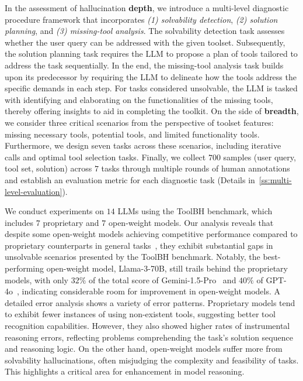 \documentclass[11pt]{article}
\newcommand{\benchname}{ToolBH\xspace}
\begin{document}
In the assessment of hallucination \textbf{depth}, we introduce a multi-level diagnostic procedure framework that incorporates \textit{(1) solvability detection}, \textit{(2) solution planning}, and \textit{(3) missing-tool analysis}.
The solvability detection task assesses whether the user query can be addressed with the given toolset. 
Subsequently, the solution planning task requires the LLM to propose a plan of tools tailored to address the task sequentially. 
In the end, the missing-tool analysis task builds upon its predecessor by requiring the LLM to delineate how the tools address the specific demands in each step. 
For tasks considered unsolvable, the LLM is tasked with identifying and elaborating on the functionalities of the missing tools, thereby offering insights to aid in completing the toolkit.
On the side of \textbf{breadth}, we consider three critical scenarios from the perspective of toolset features: missing necessary tools, potential tools, and limited functionality tools.
Furthermore, we design seven tasks across these scenarios, including iterative calls and optimal tool selection tasks.
Finally, we collect $700$ samples (user query, tool set, solution) across $7$ tasks through multiple rounds of human annotations and establish an evaluation metric for each diagnostic task (Details in~\cref{ss:multi-level-evaluation}).

We conduct experiments on $14$ LLMs using the \benchname benchmark, which includes $7$ proprietary and $7$ open-weight models.
Our analysis reveals that despite some open-weight models achieving competitive performance compared to proprietary counterparts in general tasks~\cite{2023@open-llm-leaderboard,2023@opencompass}, they exhibit substantial gaps in unsolvable scenarios presented by the \benchname benchmark. 
Notably, the best-performing open-weight model, Llama-3-70B, still trails behind the proprietary models, with only $32\%$ of the total score of Gemini-1.5-Pro~\cite{DBLP:journals/corr/abs-2403-05530@gemini-1.5} and $40\%$ of GPT-4o~\cite{openai@gpt4o}, indicating considerable room for improvement in open-weight models.
A detailed error analysis shows a variety of error patterns.
Proprietary models tend to exhibit fewer instances of using non-existent tools, suggesting better tool recognition capabilities.
However, they also showed higher rates of instrumental reasoning errors, reflecting problems comprehending the task's solution sequence and reasoning logic.
On the other hand, open-weight models suffer more from solvability hallucinations, often misjudging the complexity and feasibility of tasks. This highlights a critical area for enhancement in model reasoning.
\end{document}

